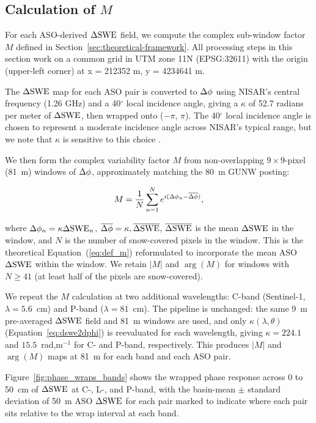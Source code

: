 \documentclass[journal abbreviation, manuscript]{copernicus}
\begin{document}
\subsection{Calculation of $M$}\label{subsec:calc-M}

For each ASO-derived $\Delta\mathrm{SWE}$ field, we compute the complex sub-window factor $M$ defined in Section~\ref{sec:theoretical-framework}. All processing steps in this section work on a common grid in UTM zone 11N (EPSG:32611) with the origin (upper-left corner) at x = 212352 m, y = 4234641 m.

The $\Delta\mathrm{SWE}$ map for each ASO pair is converted to $\Delta\phi$ using NISAR's central frequency (1.26 GHz) and a 40$^{\circ}$ local incidence angle, giving a $\kappa$ of 52.7 radians per meter of $\Delta\mathrm{SWE}$, then wrapped onto ($-\pi$, $\pi$). The 40$^{\circ}$ local incidence angle is chosen to represent a moderate incidence angle across NISAR's typical range, but we note that $\kappa$ is sensitive to this choice \citep{Leinss2015}.

We then form the complex variability factor $M$ from non-overlapping $9\times9$-pixel (81~m) windows of $\Delta\phi$, approximately matching the 80~m GUNW posting:
  
\begin{equation}\label{eq:calc_m}
    M = \frac{1}{N}\sum_{n=1}^{N} e^{i(\Delta\phi_n - \overline{\Delta\phi})},
\end{equation}

where $\Delta\phi_n = \kappa\Delta\mathrm{SWE}_n$, $\overline{\Delta\phi} = \kappa,\overline{\Delta\mathrm{SWE}}$, $\overline{\Delta\mathrm{SWE}}$ is the mean $\Delta\mathrm{SWE}$ in the window, and $N$ is the number of snow-covered pixels in the window. This is the theoretical Equation~(\ref{eq:def_m}) reformulated to incorporate the mean ASO $\Delta\mathrm{SWE}$ within the window. We retain $|M|$ and $\arg(M)$ for windows with $N \geq 41$ (at least half of the pixels are snow-covered).

We repeat the $M$ calculation at two additional wavelengths: C-band (Sentinel-1, $\lambda = 5.6$~cm) and P-band ($\lambda = 81$~cm). The pipeline is unchanged: the same 9~m pre-averaged $\Delta\mathrm{SWE}$ field and 81~m windows are used, and only $\kappa(\lambda,\theta)$ (Equation~\ref{eq:dswe2dphi}) is reevaluated for each wavelength, giving $\kappa = 224.1$ and $15.5$~rad,m$^{-1}$ for C- and P-band, respectively. This produces $|M|$ and $\arg(M)$ maps at 81~m for each band and each ASO pair.

Figure~\ref{fig:phase_wraps_bands} shows the wrapped phase response across 0 to 50~cm of $\Delta\mathrm{SWE}$ at C-, L-, and P-band, with the basin-mean $\pm$ standard deviation of 50~m ASO $\Delta\mathrm{SWE}$ for each pair marked to indicate where each pair sits relative to the wrap interval at each band.
\end{document}

